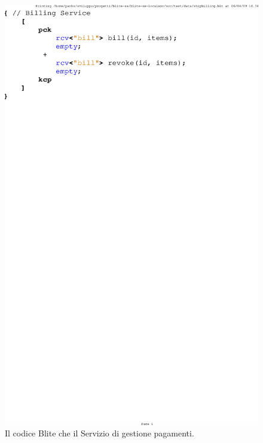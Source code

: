 \begin{figure}[b!]
\begin{center}
  \includegraphics[scale=0.80,clip]{blide/dia/billing}
   \caption[Codice Blite, interfaccia Billing Service]{Il codice Blite che
   il Servizio di gestione pagamenti.}
  \label{fig:billing}
\end{center}
\end{figure}


